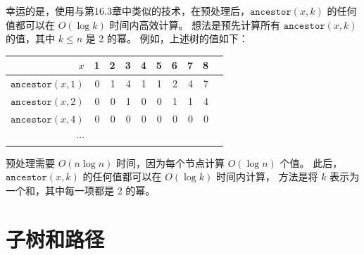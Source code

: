 幸运的是，使用与第16.3章中类似的技术，在预处理后，$\texttt{ancestor}(x,k)$ 的任何值都可以在 $O(\log k)$ 时间内高效计算。
想法是预先计算所有 $\texttt{ancestor}(x,k)$ 的值，其中 $k \le n$ 是 2 的幂。
例如，上述树的值如下：

\begin{center}
\begin{tabular}{r|rrrrrrrrr}
$x$ & 1 & 2 & 3 & 4 & 5 & 6 & 7 & 8 \\
\hline
$\texttt{ancestor}(x,1)$ & 0 & 1 & 4 & 1 & 1 & 2 & 4 & 7 \\
$\texttt{ancestor}(x,2)$ & 0 & 0 & 1 & 0 & 0 & 1 & 1 & 4 \\
$\texttt{ancestor}(x,4)$ & 0 & 0 & 0 & 0 & 0 & 0 & 0 & 0 \\
$\cdots$ \\
\end{tabular}
\end{center}

预处理需要 $O(n \log n)$ 时间，因为每个节点计算 $O(\log n)$ 个值。
此后，$\texttt{ancestor}(x,k)$ 的任何值都可以在 $O(\log k)$ 时间内计算，
方法是将 $k$ 表示为一个和，其中每一项都是 2 的幂。

\section{子树和路径}


